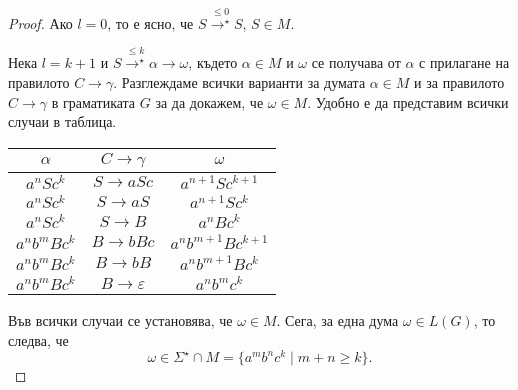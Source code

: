 \begin{proof}
  Ако $l = 0$, то е ясно, че $S \stackrel{\leq 0}{\rightarrow^\star} S$, $S \in M$.

  Нека $l = k+1$ и $S \stackrel{\leq k}{\rightarrow^\star} \alpha \rightarrow \omega$,
  където $\alpha \in M$ и $\omega$ се получава от $\alpha$ с прилагане на правилото $C \rightarrow \gamma$.
  Разглеждаме всички варианти за думата $\alpha \in M$ и за правилото $C\rightarrow \gamma$ в граматиката $G$
  за да докажем, че  $\omega \in M$.
  Удобно е да представим всички случаи в таблица.
  \begin{center}
    \begin{tabular}{| c | c | c |}
      \hline
      $\alpha$ & $C \rightarrow \gamma$ & $\omega$ \\ \hline
      $a^nSc^k$ & $S \rightarrow aSc$ & $a^{n+1}Sc^{k+1}$ \\ \hline
      $a^nSc^k$ & $S \rightarrow aS$ & $a^{n+1}Sc^{k}$ \\ \hline
      $a^nSc^k$ & $S \rightarrow B$ & $a^{n}Bc^{k}$ \\ \hline
      $a^nb^mBc^k$ & $B \rightarrow bBc$ & $a^nb^{m+1}Bc^{k+1}$\\ \hline
      $a^nb^mBc^k$ & $B \rightarrow bB$ & $a^nb^{m+1}Bc^{k}$\\ \hline
      $a^nb^mBc^k$ & $B \rightarrow \varepsilon$ & $a^nb^{m}c^{k}$\\ \hline
    \end{tabular}
  \end{center}
  Във всички случаи се установява, че $\omega \in M$.
  Сега, за една дума $\omega \in L(G)$, то следва, че
  \[\omega \in \Sigma^\star \cap M = \{a^mb^nc^k\mid m+n \geq k\}.\]
\end{proof}

